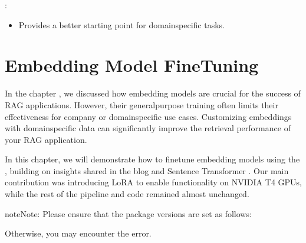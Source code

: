 \documentclass[letterpaper,11pt,english]{sphinxmanual}
\begin{document}
\sphinxAtStartPar
{}:
\begin{itemize}
\item {} 
\sphinxAtStartPar
Provides a better starting point for domain\sphinxhyphen{}specific tasks.

\end{itemize}


\section{Embedding Model Fine\sphinxhyphen{}Tuning}
\label{\detokenize{finetuning:embedding-model-fine-tuning}}
\sphinxAtStartPar
In the chapter {\hyperref[\detokenize{rag:rag}]{}}, we discussed how embedding models are crucial for the success of RAG applications.
However, their general\sphinxhyphen{}purpose training often limits their effectiveness for company\sphinxhyphen{} or domain\sphinxhyphen{}specific
use cases. Customizing embeddings with domain\sphinxhyphen{}specific data can significantly improve the retrieval
performance of your RAG application.

\sphinxAtStartPar
In this chapter, we will demonstrate how to fine\sphinxhyphen{}tune embedding models using the
, building on insights shared in the blog  and
Sentence Transformer . Our main contribution was introducing LoRA to enable functionality on
NVIDIA T4 GPUs, while the rest of the pipeline and code remained almost unchanged.

\begin{sphinxadmonition}{note}{Note:}
\sphinxAtStartPar
Please ensure that the package versions are set as follows:

\begin{sphinxVerbatim}[commandchars=\\\{\}]
    

   \PYGZbs{}
     \PYGZbs{}
      \PYGZbs{}
     \PYGZbs{}
\end{sphinxVerbatim}

\sphinxAtStartPar
Otherwise, you may encounter the error.
\end{sphinxadmonition}
\end{document}

